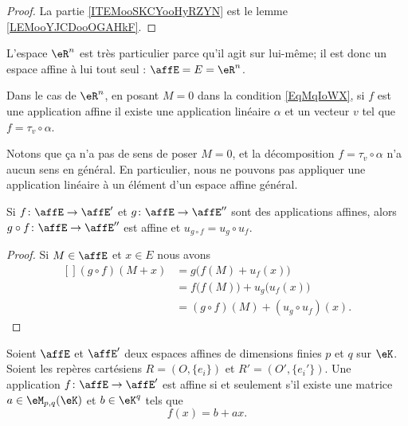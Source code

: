 \begin{proof}
    La partie \ref{ITEMooSKCYooHyRZYN} est le lemme \ref{LEMooYJCDooOGAHkF}.
\end{proof}

\begin{example}     \label{EXooAGINooYmvPML}
    L'espace \( \eR^n\) est très particulier parce qu'il agit sur lui-même; il est donc un espace affine à lui tout seul : \( \affE=E=\eR^n\).

    Dans le cas de \( \eR^n\), en posant \( M=0\) dans la condition \eqref{EqMqIoWX}, si \( f\) est une application affine il existe une application linéaire \( \alpha\) et un vecteur \( v\) tel que \( f=\tau_v\circ \alpha\).

    Notons que ça n'a pas de sens de poser \( M=0\), et la décomposition \( f=\tau_v\circ \alpha\) n'a aucun sens en général. En particulier, nous ne pouvons pas appliquer une application linéaire à un élément d'un espace affine général.
\end{example}

\begin{proposition}
    Si \( f\colon \affE\to \affE'\) et \( g\colon \affE\to \affE''\) sont des applications affines, alors \( g\circ f\colon \affE\to \affE''\) est affine et \( u_{g\circ f}=u_g\circ u_f\).
\end{proposition}

\begin{proof}
    Si \( M\in\affE\) et \( x\in E\) nous avons
    \begin{equation}
        \begin{aligned}[]
            (g\circ f)(M+x)&=g\big( f(M)+u_f(x) \big)\\
            &=f\big( f(M) \big)+u_g\big( u_f(x) \big)\\
            &=(g\circ f)(M)+(u_g\circ u_f)(x).
        \end{aligned}
    \end{equation}
\end{proof}

\begin{theorem}
    Soient \( \affE\) et \( \affE'\) deux espaces affines de dimensions finies \( p\) et \( q\) sur \( \eK\). Soient les repères cartésiens \( R=(O,\{ e_i \})\) et \( R'=(O',\{ e_i' \})\). Une application \( f\colon \affE\to \affE'\) est affine si et seulement s'il existe une matrice \( a\in\eM_{p,q}(\eK)\) et \( b\in \eK^q\) tels que
    \begin{equation}    \label{EqCmNHjs}
        f(x)=b+ax.
    \end{equation}
\end{theorem}

